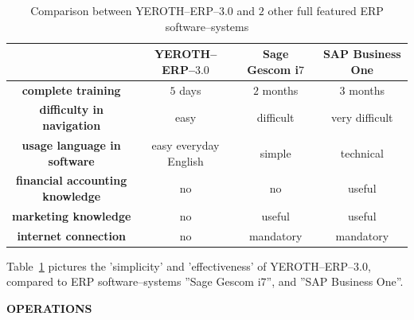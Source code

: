 \documentclass[12pt, a4paper]{article}
\newcommand{\yerotherp}{\textcolor{yerothColorBlue}{\sc YEROTH--ERP--$3.0$}\xspace}
\newcommand{\saperp}{SAP Business One\xspace}
\newcommand{\sageerp}{Sage Gescom i$7$\xspace}
\newcommand{\yerothvert}[1]{\textcolor{yerothColorGreen}{#1}\xspace}
\newcommand{\yerothorange}[1]{\textcolor{yerothColorOrange}{#1}\xspace}
\newcommand{\yerothrouge}[1]{\textcolor{yerothColorRed}{#1}\xspace}
\newcommand{\yerothfacile}{\yerothvert{easy}\xspace}
\newcommand{\yerothdifficile}{\yerothorange{difficult}\xspace}
\newcommand{\yerothtresdifficile}{\yerothrouge{very difficult}\xspace}
\begin{document}
\vspace{0.7cm}

\begin{table}[!htbp]
\centering
\begin{tabular}{cccc}

\multicolumn{1}{c}{}			&
\yerotherp 						& 
\sageerp						&
\saperp		\\ \hline

\textbf{complete training}		&
		\yerothvert{$5$ days}			&
		\yerothorange{$2$ months}			&						
		\yerothrouge{$3$ months}			\\ \hline

\textbf{difficulty in navigation}		&
		\yerothfacile					&
		\yerothdifficile				&						
		\yerothtresdifficile				\\  \hline
		
\textbf{usage language in software}			&
		\yerothvert{easy everyday English}	&
		\yerothorange{simple}					&						
		\yerothrouge{technical}					\\ \hline			
		
\textbf{financial accounting knowledge}	&
		\yerothvert{no}		&
		\yerothvert{no}		&						
		\yerothorange{useful}	\\ \hline		

\textbf{marketing knowledge}	&
		\yerothvert{no}			&
		\yerothorange{useful}	&						
		\yerothorange{useful}	\\ \hline
		
\textbf{internet connection}				&
		\yerothvert{no}			&
		\yerothrouge{mandatory}	&						
		\yerothrouge{mandatory}	\\		
\end{tabular}
\caption{Comparison between \yerotherp and $2$ other full featured ERP software--systems\\}
\label{tab:comparison-against-others-erp-software-systems}
\end{table}

\vspace{0.3cm}

Table~\ref{tab:comparison-against-others-erp-software-systems}
pictures the 'simplicity' and 'effectiveness' of \yerotherp, 
compared to ERP software--systems ''\sageerp'', and ''\saperp''.\\

\vspace{0.68em}

{\large \bf OPERATIONS}

\vspace{0.75em}
\end{document}
